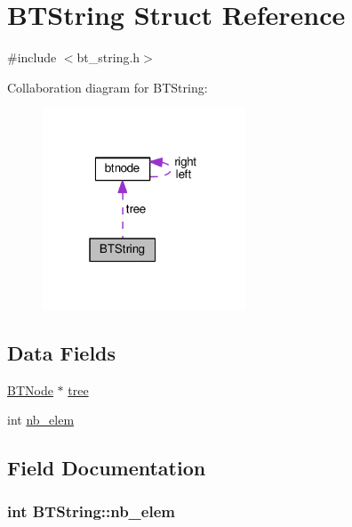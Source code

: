 \hypertarget{structBTString}{}\section{B\+T\+String Struct Reference}
\label{structBTString}


{\ttfamily \#include $<$bt\+\_\+string.\+h$>$}



Collaboration diagram for B\+T\+String\+:\nopagebreak
\begin{figure}[H]
\begin{center}
\leavevmode
\includegraphics[width=171pt]{structBTString__coll__graph}
\end{center}
\end{figure}
\subsection*{Data Fields}
\begin{DoxyCompactItemize}
\item 
\hyperlink{bt__string_8h_a94e2311ccccb66fae2c4ce55649526fc}{B\+T\+Node} $\ast$ \hyperlink{structBTString_a3d5e702b03b4afc55252841d531836f8}{tree}
\item 
int \hyperlink{structBTString_a4248622c60ccba995140069c3c1fa116}{nb\+\_\+elem}
\end{DoxyCompactItemize}


\subsection{Field Documentation}
\subsubsection[{\texorpdfstring{nb\+\_\+elem}{nb_elem}}]{\setlength{\rightskip}{0pt plus 5cm}int B\+T\+String\+::nb\+\_\+elem}\hypertarget{structBTString_a4248622c60ccba995140069c3c1fa116}{}\label{structBTString_a4248622c60ccba995140069c3c1fa116}
